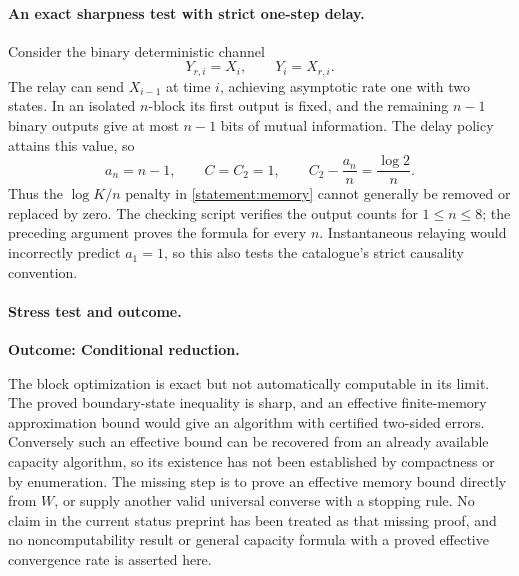 \documentclass[11pt,a4paper]{article}
\numberwithin{equation}{section}
\begin{document}
\paragraph{An exact sharpness test with strict one-step delay.}
Consider the binary deterministic channel
\begin{equation}
 Y_{r,i}=X_i,\qquad Y_i=X_{r,i}.
\end{equation}
The relay can send $X_{i-1}$ at time $i$, achieving asymptotic rate one
with two states. In an isolated $n$-block its first output is fixed,
and the remaining $n-1$ binary outputs give at most $n-1$ bits of mutual
information. The delay policy attains this value, so
\begin{equation}
 a_n=n-1,\qquad C=C_2=1,
 \qquad C_2-\frac{a_n}{n}=\frac{\log2}{n}.
\end{equation}
Thus the $\log K/n$ penalty in \eqref{statement:memory} cannot generally be
removed or replaced by zero. The checking script verifies the output
counts for $1\leq n\leq8$; the preceding argument proves the formula
for every $n$. Instantaneous relaying would incorrectly predict
$a_1=1$, so this also tests the catalogue's strict causality convention.

\paragraph{Stress test and outcome.}
\textbf{Outcome: Conditional reduction.}

The block optimization is exact but not automatically computable in
its limit. The proved boundary-state inequality is sharp, and an
effective finite-memory approximation bound would give an algorithm
with certified two-sided errors. Conversely such an effective bound
can be recovered from an already available capacity algorithm, so its
existence has not been established by compactness or by enumeration.
The missing step is to prove an effective memory bound directly from
$W$, or supply another valid universal converse with a stopping rule.
No claim in the current status preprint has been treated as that missing
proof, and no noncomputability result or general capacity formula with
a proved effective convergence rate is asserted here.
\end{document}

